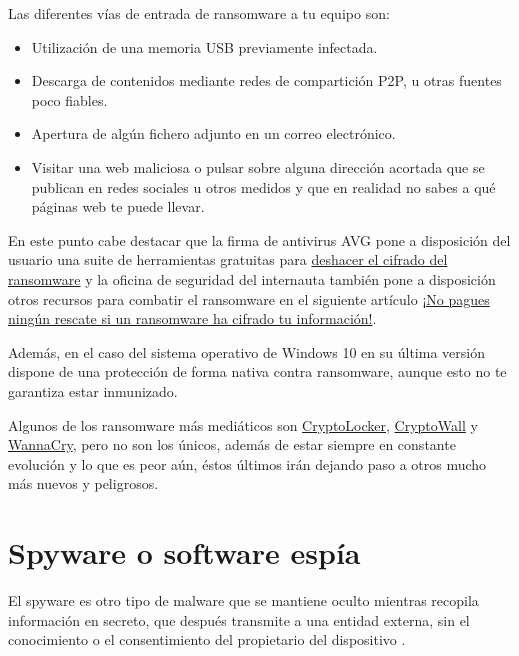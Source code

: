 \documentclass[
  a4paper,
  openany]{book}
\begin{document}
Las diferentes vías de entrada de ransomware a tu equipo son:

\begin{itemize}
\item
  Utilización de una memoria USB previamente infectada.
\item
  Descarga de contenidos mediante redes de compartición P2P, u otras fuentes poco fiables.
\item
  Apertura de algún fichero adjunto en un correo electrónico.
\item
  Visitar una web maliciosa o pulsar sobre alguna dirección acortada que se publican en redes sociales u otros medidos y que en realidad no sabes a qué páginas web te puede llevar.
\end{itemize}

En este punto cabe destacar que la firma de antivirus AVG pone a disposición del usuario una suite de herramientas gratuitas para \href{https://www.avg.com/es-es/ransomware-decryption-tools}{deshacer el cifrado del ransomware} y la oficina de seguridad del internauta también pone a disposición otros recursos para combatir el ransomware en el siguiente artículo \href{https://www.osi.es/es/actualidad/blog/2022/11/17/no-pagues-ningun-rescate-si-un-ransomware-ha-cifrado-tu-informacion}{¡No pagues ningún rescate si un ransomware ha cifrado tu información!}.

Además, en el caso del sistema operativo de Windows 10 en su última versión dispone de una protección de forma nativa contra ransomware, aunque esto no te garantiza estar inmunizado.

Algunos de los ransomware más mediáticos son \href{https://es.wikipedia.org/wiki/CryptoLocker}{CryptoLocker}, \href{https://es.wikipedia.org/wiki/Ransomware\#CryptoWall}{CryptoWall} y \href{https://es.wikipedia.org/wiki/WannaCry}{WannaCry}, pero no son los únicos, además de estar siempre en constante evolución y lo que es peor aún, éstos últimos irán dejando paso a otros mucho más nuevos y peligrosos.

\hypertarget{spyware-o-software-espuxeda}{%
\section{Spyware o software espía}\label{spyware-o-software-espuxeda}}

El spyware es otro tipo de malware que se mantiene oculto mientras recopila información en secreto, que después transmite a una entidad externa, sin el conocimiento o el consentimiento del propietario del dispositivo \citep{AVAST-spyware}.
\end{document}
